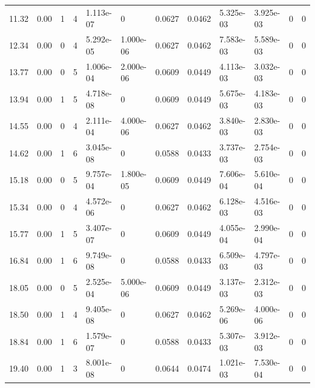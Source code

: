 \documentclass[preview]{standalone}
\begin{document}
{{\begin{tabular}{L{1.2cm}C{1.2cm} C{0.3cm}C{0.5cm} C{1.4cm}C{1.4cm} C{1.4cm}C{1.4cm} C{1.6cm}C{1.6cm} C{1.6cm}C{1.6cm}}
  11.32  &  0.00  & 1     &  4 &  1.113e-07  & 0  &  0.0627&   0.0462& 5.325e-03 & 3.925e-03   &  0 & 0  \\ 
  12.34  &  0.00  & 0     &  4 &  5.292e-05  & 1.000e-06  &  0.0627&   0.0462& 7.583e-03 & 5.589e-03   &  0 & 0  \\ 
  13.77  &  0.00  & 0     &  5 &  1.006e-04  & 2.000e-06  &  0.0609&   0.0449& 4.113e-03 & 3.032e-03   &  0 & 0  \\ 
  13.94  &  0.00  & 1     &  5 &  4.718e-08  & 0  &  0.0609&   0.0449& 5.675e-03 & 4.183e-03   &  0 & 0  \\ 
  14.55  &  0.00  & 0     &  4 &  2.111e-04  & 4.000e-06  &  0.0627&   0.0462& 3.840e-03 & 2.830e-03   &  0 & 0  \\ 
  14.62  &  0.00  & 1     &  6 &  3.045e-08  & 0  &  0.0588&   0.0433& 3.737e-03 & 2.754e-03   &  0 & 0  \\ 
  15.18  &  0.00  & 0     &  5 &  9.757e-04  & 1.800e-05  &  0.0609&   0.0449& 7.606e-04 & 5.610e-04   &  0 & 0  \\ 
  15.34  &  0.00  & 0     &  4 &  4.572e-06  & 0  &  0.0627&   0.0462& 6.128e-03 & 4.516e-03   &  0 & 0  \\ 
  15.77  &  0.00  & 1     &  5 &  3.407e-07  & 0  &  0.0609&   0.0449& 4.055e-04 & 2.990e-04   &  0 & 0  \\ 
  16.84  &  0.00  & 1     &  6 &  9.749e-08  & 0  &  0.0588&   0.0433& 6.509e-03 & 4.797e-03   &  0 & 0  \\ 
  18.05  &  0.00  & 0     &  5 &  2.525e-04  & 5.000e-06  &  0.0609&   0.0449& 3.137e-03 & 2.312e-03   &  0 & 0  \\ 
  18.50  &  0.00  & 1     &  4 &  9.405e-08  & 0  &  0.0627&   0.0462& 5.269e-06 & 4.000e-06   &  0 & 0  \\ 
  18.84  &  0.00  & 1     &  6 &  1.579e-07  & 0  &  0.0588&   0.0433& 5.307e-03 & 3.912e-03   &  0 & 0  \\ 
  19.40  &  0.00  & 1     &  3 &  8.001e-08  & 0  &  0.0644&   0.0474& 1.021e-03 & 7.530e-04   &  0 & 0  \\ 
\hline 
\end{tabular} 

}}
\end{document}
